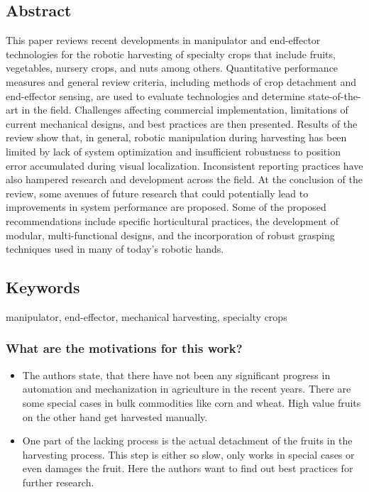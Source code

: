     \subsection*{Abstract}
    This paper reviews recent developments in manipulator and end-effector technologies for the robotic
    harvesting of specialty crops that include fruits, vegetables, nursery crops, and nuts among others.
    Quantitative performance measures and general review criteria, including methods of crop detachment and
    end-effector sensing, are used to evaluate technologies and determine state-of-the-art in the field. Challenges
    affecting commercial implementation, limitations of current mechanical designs, and best practices are then
    presented. Results of the review show that, in general, robotic manipulation during harvesting has been
    limited by lack of system optimization and insufficient robustness to position error accumulated during
    visual localization. Inconsistent reporting practices have also hampered research and development across
    the field. At the conclusion of the review, some avenues of future research that could potentially lead to
    improvements in system performance are proposed. Some of the proposed recommendations include
    specific horticultural practices, the development of modular, multi-functional designs, and the incorporation
    of robust grasping techniques used in many of today’s robotic hands.
    
    \subsection*{Keywords}
    manipulator, end-effector, mechanical harvesting, specialty crops
    
     
    \subsubsection*{What are the motivations for this work?}
    \begin{itemize}
        \item The authors state, that there have not been any significant progress in automation and mechanization in agriculture in the recent years. There are some special cases in bulk commodities like corn and wheat. High value fruits on the other hand get harvested manually.
        \item One part of the lacking process is the actual detachment of the fruits in the harvesting process. This step is either so slow, only works in special cases or even damages the fruit. Here the authors want to find out best practices for further research.
    \end{itemize}
